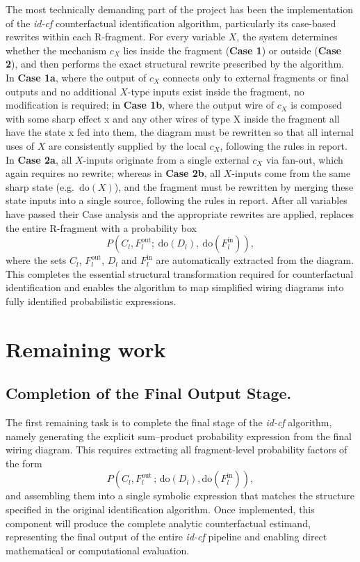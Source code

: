 \documentclass[12pt,a4paper]{article}
\begin{document}
The most technically demanding part of the project has been the  implementation of the \textit{id-cf} counterfactual identification algorithm, particularly its case-based rewrites within each R-fragment. For every variable $X$, the system determines whether the mechanism $c_X$ lies inside the fragment (\textbf{Case 1}) or outside (\textbf{Case 2}), and then performs the exact structural rewrite prescribed by the algorithm. In \textbf{Case 1a}, where the output of $c_X$ connects only to external fragments or final outputs and no additional $X$-type inputs exist inside the fragment, no modification is required; in \textbf{Case 1b}, where the output wire of $c_X$ is composed with some sharp effect x and any other wires of type X inside the fragment all have the state x fed into them, the diagram must be rewritten so that all internal uses of $X$ are consistently supplied by the local $c_X$, following the rules in report. In \textbf{Case 2a}, all $X$-inputs originate from a single external $c_X$ via fan-out, which again requires no rewrite; whereas in \textbf{Case 2b}, all $X$-inputs come from the same sharp state (e.g.\ $\mathrm{do}(X)$), and the fragment must be rewritten by merging these state inputs into a single source, following the rules in report. After all variables have passed their Case analysis and the appropriate rewrites are applied, replaces the entire R-fragment with a probability box 
\[
P(C_l, F^{\mathrm{out}}_l;\ \mathrm{do}(D_l),\ \mathrm{do}(F^{\mathrm{in}}_l)),
\]
where the sets $C_l$, $F^{\mathrm{out}}_l$, $D_l$ and $F^{\mathrm{in}}_l$ are automatically extracted from the diagram. This completes the essential structural transformation required for counterfactual identification and enables the algorithm to map simplified wiring diagrams into fully identified probabilistic expressions.

\section{Remaining work}

\subsection{Completion of the Final Output Stage.}
The first remaining task is to complete the final stage of the \textit{id-cf} algorithm, namely generating the explicit sum--product probability expression from the final wiring diagram. This requires extracting all fragment-level probability factors of the form 
\[
P(C_l, F^{\mathrm{out}}_l \,;\, \mathrm{do}(D_l), \mathrm{do}(F^{\mathrm{in}}_l)),
\]
and assembling them into a single symbolic expression that matches the structure specified in the original identification algorithm. Once implemented, this component will produce the complete analytic counterfactual estimand, representing the final output of the entire \textit{id-cf} pipeline and enabling direct mathematical or computational evaluation.
\end{document}
